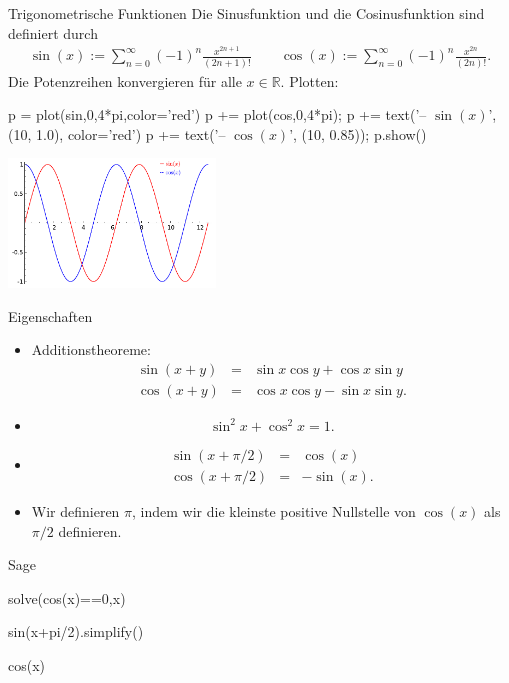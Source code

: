 \documentclass[notes=hide,hyperref={dvipdfmx,pdfpagelabels=false}]{beamer}
\begin{document}
\begin{frame}[fragile]{Trigonometrische Funktionen}
Die {\color{red} Sinusfunktion} und die {\color{red} Cosinusfunktion} sind definiert
durch
\begin{eqnarray*}
\sin(x) := \sum_{n=0}^\infty (-1)^n \frac{x^{2n+1}}{(2n+1)!} \quad\quad
\cos(x) := \sum_{n=0}^\infty (-1)^n \frac{x^{2n}}{(2n)!}. 
\end{eqnarray*}
Die Potenzreihen konvergieren für alle $x \in \mathbb{R}$. Plotten:
\begin{sagein}
p = plot(sin,0,4*pi,color='red')
p += plot(cos,0,4*pi); 
p += text('-- $\sin(x)$', (10, 1.0), color='red')
p += text('-- $\cos(x)$', (10, 0.85)); p.show()
\end{sagein}
\begin{center}
\includegraphics[width=5.5cm]{figures/sincos.pdf}
\end{center}
\end{frame}

\begin{frame}{Eigenschaften}
\begin{itemize}
\item \alert{Additionstheoreme}:
\begin{eqnarray*}
\sin(x+y) & = &\sin x \cos y+ \cos x \sin y \\
\cos(x+y) & = &\cos x \cos y - \sin x \sin y .
\end{eqnarray*} 
\item 
\[\sin^2x +\cos^2x=1.\]
\item 
\begin{eqnarray*}
\sin(x+\pi/2)&=&\cos(x)\\
 \cos(x+\pi/2)&=&-\sin(x).
\end{eqnarray*} 
\item Wir definieren $\pi$, indem wir die kleinste positive Nullstelle
von $\cos(x)$ als $\pi/2$ definieren.

\end{itemize}
\end{frame}

\begin{frame}[fragile]{Sage}
\begin{sagein}
solve(cos(x)==0,x)
\end{sagein}
\begin{sage}
[x == 1/2*pi]
\end{sage}
\begin{sagein}
sin(x+pi/2).simplify()
\end{sagein}
\begin{sage}
cos(x)
\end{sage}
\end{frame}
\end{document}
